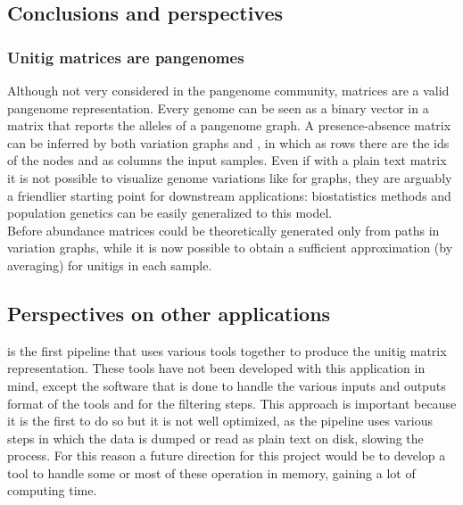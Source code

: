 \subsection{Conclusions and perspectives}
\subsubsection{Unitig matrices are pangenomes}
Although not very considered in the pangenome community, matrices are a valid pangenome representation. Every genome can be seen as a binary vector in a matrix that reports the alleles of a pangenome graph. A presence-absence matrix can be inferred by both variation graphs and \ccdbgs, in which as rows there are the ids of the nodes and as columns the input samples.  
Even if with a plain text matrix it is not possible to visualize genome variations like for graphs, they are arguably a friendlier starting point for downstream applications: biostatistics methods and population genetics can be easily generalized to this model.\\
Before \muset abundance matrices could be theoretically generated only from paths in variation graphs, while it is now possible to obtain a sufficient approximation (by averaging) for unitigs in each sample.\\
\subsection{Perspectives on other applications}
\muset is the first pipeline that uses various tools together to produce the unitig matrix representation. These tools have not been developed with this application in mind, except the \kmat software that is done to handle the various inputs and outputs format of the tools and for the filtering steps. This approach is important because it is the first to do so but it is not well optimized, as the pipeline uses various steps in which the data is dumped or read as plain text on disk, slowing the process. For this reason a future direction for this project would be to develop a tool to handle some or most of these operation in memory, gaining a lot of computing time.\\

